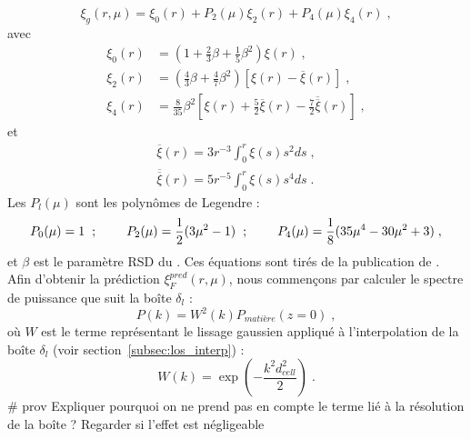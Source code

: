 \documentclass[11pt, twoside, a4paper, openright]{report}
\begin{document}
\begin{equation}
  \label{eq:hamilton1}
  \xi_g(r, \mu) = \xi_0(r) +  P_2(\mu) \xi_2(r) +  P_4(\mu) \xi_4(r) \; ,
\end{equation}
avec
\begin{align}
  \label{eq:hamilton2}
  \xi_0(r) &= \left(1 + \frac{2}{3} \beta + \frac{1}{5} \beta^2\right) \xi(r) \; , \\
  \xi_2(r) &= \left(\frac{4}{3} \beta + \frac{4}{7} \beta^2\right) \left[\xi(r) - \overline \xi(r)\right] \; , \\
  \xi_4(r) &= \frac{8}{35} \beta^2\left[\xi(r) + \frac{5}{2} \overline \xi(r) - \frac{7}{2} \overline{\overline \xi}(r)\right] \; ,
\end{align}
et
\begin{align}
  \label{eq:hamilton3}
  \overline \xi(r) = 3 r^{-3} \int_0^r \xi(s) s^2 ds \; , \\
  \overline{\overline \xi}(r) = 5 r^{-5} \int_0^r \xi(s) s^4 ds \; .
\end{align}
Les $P_l(\mu)$ sont les polynômes de Legendre :
\begin{equation}
  P_0(\mu) = 1 \hspace{0.2cm} ; \hspace{0.8cm} P_2(\mu) = \frac{1}{2} (3 \mu^2 - 1) \hspace{0.2cm} ; \hspace{0.8cm}   P_4(\mu) = \frac{1}{8} (35 \mu^4 - 30 \mu^2 + 3) \; ,
\end{equation}
et $\beta$ est le paramètre RSD du \lya{}.
Ces équations sont tirés de la publication de \textcite{hamilton_measuring_1992}.
Afin d'obtenir la prédiction $\xi_F^{pred}(r, \mu)$, nous commençons par calculer  le spectre de puissance que suit la boîte $\delta_l$ :
\begin{equation}
  P(k) = W^2(k)P_{matière}(z=0) \; ,
\end{equation}
où $W$ est le terme représentant le lissage gaussien appliqué à l'interpolation de la boîte $\delta_l$ (voir section~\ref{subsec:los_interp}) :
\begin{equation}
  \label{eq:gauss_smoothing}
  W(k) = \exp(- \frac{k^2 d_{cell}^2}{2}) \;.
\end{equation}
\# prov Expliquer pourquoi on ne prend pas en compte le terme lié à la résolution de la boîte ? Regarder si l'effet est négligeable
\end{document}
